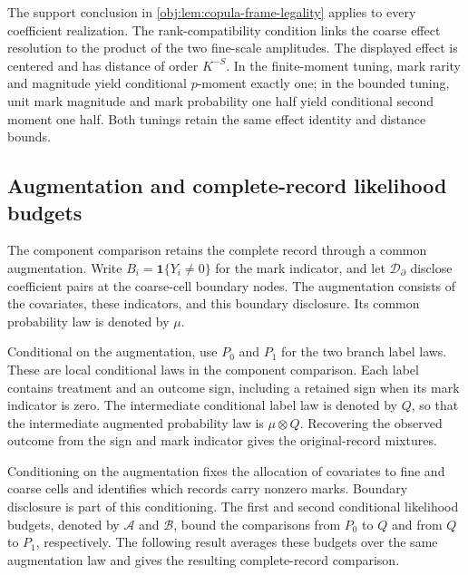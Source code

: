 The support conclusion in \cref{obj:lem:copula-frame-legality} applies to every coefficient realization. The rank-compatibility condition links the coarse effect resolution to the product of the two fine-scale amplitudes. The displayed effect is centered and has distance of order \(K^{-S}\). In the finite-moment tuning, mark rarity and magnitude yield conditional \(p\)-moment exactly one; in the bounded tuning, unit mark magnitude and mark probability one half yield conditional second moment one half. Both tunings retain the same effect identity and distance bounds.

\subsection{Augmentation and complete-record likelihood budgets}

The component comparison retains the complete record through a common augmentation. Write \(B_i=\mathbf1\{Y_i\ne0\}\) for the mark indicator, and let \(\mathcal D_{\partial}\) disclose coefficient pairs at the coarse-cell boundary nodes. The augmentation consists of the covariates, these indicators, and this boundary disclosure. Its common probability law is denoted by \(\mu\).

Conditional on the augmentation, use \(P_0\) and \(P_1\) for the two branch label laws. These are local conditional laws in the component comparison. Each label contains treatment and an outcome sign, including a retained sign when its mark indicator is zero. The intermediate conditional label law is denoted by \(Q\), so that the intermediate augmented probability law is \(\mu\otimes Q\). Recovering the observed outcome from the sign and mark indicator gives the original-record mixtures.

Conditioning on the augmentation fixes the allocation of covariates to fine and coarse cells and identifies which records carry nonzero marks. Boundary disclosure is part of this conditioning. The first and second conditional likelihood budgets, denoted by \(\mathcal A\) and \(\mathcal B\), bound the comparisons from \(P_0\) to \(Q\) and from \(Q\) to \(P_1\), respectively. The following result averages these budgets over the same augmentation law and gives the resulting complete-record comparison.

